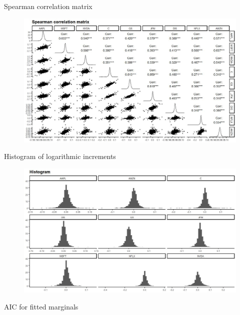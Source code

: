 \documentclass{beamer}
\begin{document}
\begin{frame}{Spearman correlation matrix}
\centering
\begin{figure}[!h]
  \centering
    \includegraphics[width=1\textwidth]{figures/correlation/spearman_matrix.jpeg}
\end{figure}
    
\end{frame}

\begin{frame}{Histogram of logarithmic increments}

\centering
\begin{figure}[!h]
  \centering
    \includegraphics[width=1\textwidth]{figures/histogram_indexes.jpeg}
\end{figure}
    
\end{frame}

\begin{frame}{AIC for fitted marginals}

\centering
\begin{table}
   
\end{table}

\end{frame}
\end{document}

